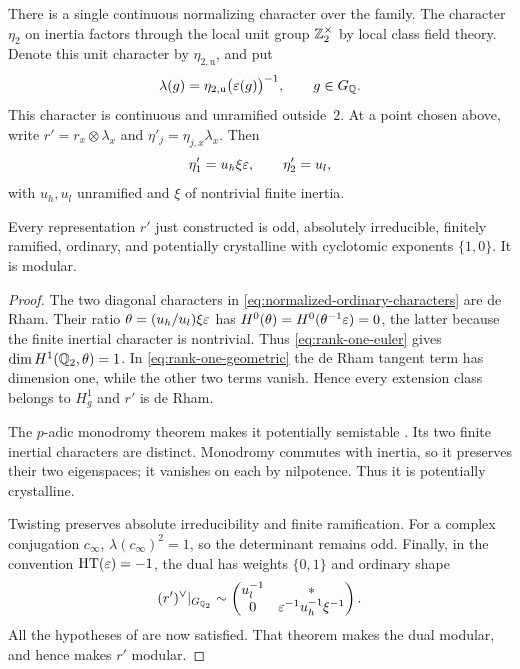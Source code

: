 There is a single continuous normalizing character over the family.
The character $\eta_2$ on inertia factors through the local unit group
$\mathbb Z_2^\times$ by local class field theory.  Denote this unit character
by $\eta_{2,\mathrm{u}}$, and put
\begin{equation}\label{eq:normalizing-character}
 \lambda(g)=\eta_{2,\mathrm{u}}\bigl(\varepsilon(g)\bigr)^{-1},
 \qquad g\in G_{\mathbb Q}.
\end{equation}
This character is continuous and unramified outside~$2$.  At a point
chosen above, write $r'=r_x\otimes\lambda_x$ and
$\eta'_j=\eta_{j,x}\lambda_x$.  Then
\begin{equation}\label{eq:normalized-ordinary-characters}
                \eta'_1=u_h\xi\varepsilon,
          \qquad\eta'_2=u_l,
\end{equation}
with $u_h,u_l$ unramified and $\xi$ of nontrivial finite inertia.

\begin{lemma}\label{lem:dense-Thorne-points}
Every representation $r'$ just constructed is odd, absolutely
irreducible, finitely ramified, ordinary, and potentially crystalline
with cyclotomic exponents $\{1,0\}$.  It is modular.
\end{lemma}
\begin{proof}
The two diagonal characters in
\eqref{eq:normalized-ordinary-characters} are de Rham.  Their ratio
$\theta=(u_h/u_l)\xi\varepsilon$ has
$H^0(\theta)=H^0(\theta^{-1}\varepsilon)=0$, the latter because the finite
inertial character is nontrivial.  Thus \eqref{eq:rank-one-euler} gives
$\dim H^1(\mathbb Q_2,\theta)=1$.  In
\eqref{eq:rank-one-geometric} the de Rham tangent term has dimension
one, while the other two terms vanish.  Hence every extension class
belongs to $H^1_g$ and $r'$ is de Rham.

The $p$-adic monodromy theorem makes it potentially semistable
\cite[Theorems~0.6 and~5.19]{Berger2002}.  Its two finite inertial
characters are distinct.  Monodromy commutes with inertia, so it
preserves their two eigenspaces; it vanishes on each by nilpotence.
Thus it is potentially crystalline.

Twisting preserves absolute irreducibility and finite ramification.
For a complex conjugation $c_\infty$, $\lambda(c_\infty)^2=1$, so
the determinant remains odd.  Finally, in the convention
$\operatorname{HT}(\varepsilon)=-1$, the dual has weights $\{0,1\}$ and ordinary shape
\[
 (r')^\vee|_{G_{\mathbb Q_2}}\sim
 \begin{pmatrix}
   u_l^{-1}&*\\0&\varepsilon^{-1}u_h^{-1}\xi^{-1}
 \end{pmatrix}.
\]
All the hypotheses of \cite[Theorem~D]{Thorne2026} are now satisfied.
That theorem makes the dual modular, and hence makes $r'$ modular.
\end{proof}

